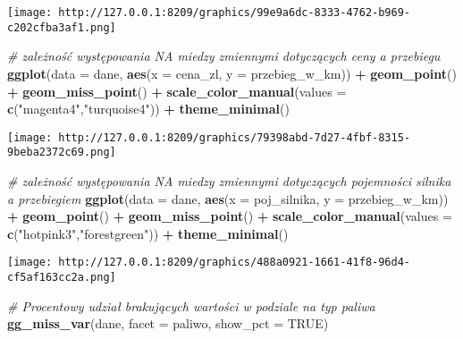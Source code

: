 \documentclass[
]{article}
\newenvironment{Shaded}{\begin{snugshade}}{\end{snugshade}}
\newcommand{\AttributeTok}[1]{\textcolor[rgb]{0.13,0.29,0.53}{#1}}
\newcommand{\CommentTok}[1]{\textcolor[rgb]{0.56,0.35,0.01}{\textit{#1}}}
\newcommand{\ConstantTok}[1]{\textcolor[rgb]{0.56,0.35,0.01}{#1}}
\newcommand{\FunctionTok}[1]{\textcolor[rgb]{0.13,0.29,0.53}{\textbf{#1}}}
\newcommand{\NormalTok}[1]{#1}
\newcommand{\SpecialCharTok}[1]{\textcolor[rgb]{0.81,0.36,0.00}{\textbf{#1}}}
\newcommand{\StringTok}[1]{\textcolor[rgb]{0.31,0.60,0.02}{#1}}
\begin{document}
\texttt{[image: http://127.0.0.1:8209/graphics/99e9a6dc-8333-4762-b969-c202cfba3af1.png]}

\begin{Shaded}
\begin{Highlighting}[]
\CommentTok{\# zależność występowania NA miedzy zmiennymi dotyczących ceny a przebiegu }
\FunctionTok{ggplot}\NormalTok{(}\AttributeTok{data =}\NormalTok{ dane, }\FunctionTok{aes}\NormalTok{(}\AttributeTok{x =}\NormalTok{ cena\_zl, }\AttributeTok{y =}\NormalTok{ przebieg\_w\_km)) }\SpecialCharTok{+} 
  \FunctionTok{geom\_point}\NormalTok{() }\SpecialCharTok{+}
  \FunctionTok{geom\_miss\_point}\NormalTok{() }\SpecialCharTok{+}
  \FunctionTok{scale\_color\_manual}\NormalTok{(}\AttributeTok{values =} \FunctionTok{c}\NormalTok{(}\StringTok{"magenta4"}\NormalTok{,}\StringTok{"turquoise4"}\NormalTok{)) }\SpecialCharTok{+}
  \FunctionTok{theme\_minimal}\NormalTok{()}
\end{Highlighting}
\end{Shaded}

\texttt{[image: http://127.0.0.1:8209/graphics/79398abd-7d27-4fbf-8315-9beba2372c69.png]}

\begin{Shaded}
\begin{Highlighting}[]
\CommentTok{\# zależność występowania NA miedzy zmiennymi dotyczących pojemności silnika a przebiegiem }
\FunctionTok{ggplot}\NormalTok{(}\AttributeTok{data =}\NormalTok{ dane, }\FunctionTok{aes}\NormalTok{(}\AttributeTok{x =}\NormalTok{ poj\_silnika, }\AttributeTok{y =}\NormalTok{ przebieg\_w\_km)) }\SpecialCharTok{+} 
  \FunctionTok{geom\_point}\NormalTok{() }\SpecialCharTok{+}
  \FunctionTok{geom\_miss\_point}\NormalTok{() }\SpecialCharTok{+}
  \FunctionTok{scale\_color\_manual}\NormalTok{(}\AttributeTok{values =} \FunctionTok{c}\NormalTok{(}\StringTok{"hotpink3"}\NormalTok{,}\StringTok{"forestgreen"}\NormalTok{)) }\SpecialCharTok{+}
  \FunctionTok{theme\_minimal}\NormalTok{()}
\end{Highlighting}
\end{Shaded}

\texttt{[image: http://127.0.0.1:8209/graphics/488a0921-1661-41f8-96d4-cf5af163cc2a.png]}

\begin{Shaded}
\begin{Highlighting}[]
\CommentTok{\# Procentowy udział brakujących wartości w podziale na typ paliwa}
\FunctionTok{gg\_miss\_var}\NormalTok{(dane, }\AttributeTok{facet =}\NormalTok{ paliwo, }\AttributeTok{show\_pct =} \ConstantTok{TRUE}\NormalTok{)}
\end{Highlighting}
\end{Shaded}
\end{document}
